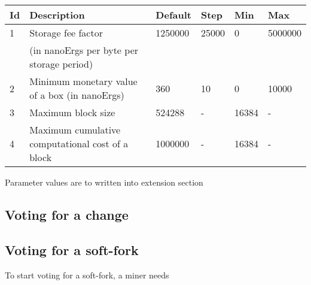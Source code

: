 \begin{tabular}{| l | l | l | l | l | l |}
\hline
Id & Description & Default & Step & Min & Max \\
\hline
\hline
1 & Storage fee factor  & 1250000 & 25000 & 0 & 5000000 \\
  &  (in nanoErgs per byte per storage period) & & & & \\
\hline
2 & Minimum monetary value of a box (in nanoErgs) & 360 & 10 & 0 & 10000 \\
\hline
3 & Maximum block size & 524288 & - & 16384 & - \\
\hline
4 & Maximum cumulative computational cost of a block & 1000000 & - & 16384 & - \\
\hline
\end{tabular}

Parameter values are to written into extension section




\subsection{Voting for a change}

\subsection{Voting for a soft-fork}

To start voting for a soft-fork, a miner needs